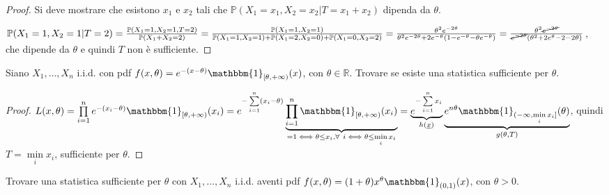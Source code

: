 \documentclass[hidelinks, 10pt]{report}
\begin{document}
\begin{proof}
Si deve mostrare che esistono $ x_1 $ e $ x_2 $ tali che $ {\mathbb{P}(X_1 = x_1, X_2 = x_2 \vert T = x_1 + x_2)} $ dipenda da $ \theta $.

$ \mathbb{P}(X_1 = 1, X_2 = 1 \vert T = 2) = \frac{\mathbb{P}(X_1 = 1, X_2 = 1, T = 2)}{\mathbb{P}(X_1 + X_2 = 2)} = \frac{\mathbb{P}(X_1 = 1, X_2 = 1)}{\mathbb{P}(X_1 = 1, X_2 = 1) + \mathbb{P}(X_1 = 2, X_2 = 0) + \mathbb{P}(X_1 = 0, X_2 = 2)} = \frac{\theta^2 e^{-2 \theta}}{\theta^2 e^{-2 \theta} + 2 e^{-\theta} (1 - e^{- \theta} - \theta e^{-\theta})} = \frac{\theta^2 \cancel{e^{-2 \theta}}}{\cancel{e^{-2 \theta}} (\theta^2 + 2 e^{\theta} - 2 - 2 \theta)} $, che dipende da $ \theta $ e quindi $ T $ non \`e sufficiente.
\end{proof}


\begin{ex}[11.1.8 Roussas]
Siano $ X_1, \dotsc, X_n $ i.i.d. con pdf $ f(x, \theta) = e^{-(x-\theta)} \mathbbm{1}_{[\theta, +\infty)} (x) $, con $ \theta \in \mathbb{R} $. Trovare se esiste una statistica sufficiente per $ \theta $.
\end{ex}

\begin{proof}
$ L(x, \theta) = \prod\limits_{i = 1}^{n} e^{-(x_i - \theta)} \mathbbm{1}_{[\theta, +\infty)} (x_i) = e^{- \sum\limits_{i = 1}^{n} (x_i - \theta)} \underbrace{\prod\limits_{i = 1}^{n} \mathbbm{1}_{[\theta, +\infty)} (x_i)}_{= 1 \iff \theta \le x_i, \forall\ i \iff \theta \le \min\limits_i x_i} = \underbrace{e^{- \sum\limits_{i = 1}^{n} x_i}}_{h(\underline{x})} \underbrace{e^{n \theta} \mathbbm{1}_{(-\infty, \min\limits_i x_i]} (\theta)}_{g(\theta, T)} $, quindi $ T = \min\limits_i x_i $, sufficiente per $ \theta $.
\end{proof}


\begin{ex}
Trovare una statistica sufficiente per $ \theta $ con $ X_1, \dotsc, X_n $ i.i.d. aventi pdf $ f(x, \theta) = (1 + \theta) x^{\theta} \mathbbm{1}_{(0, 1)} (x) $, con $ \theta > 0 $. 
\end{ex}
\end{document}
